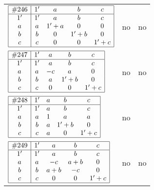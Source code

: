 \documentclass[12pt]{article}
\theoremstyle{definition}
\newcommand{\join}{\mathbin{+}}%
\newcommand{\id}{{1'}}%
\renewcommand{\top}{1}%
\begin{document}
\begin{center}
\begin{longtable}{l|c|c}
$
\begin{array}{|c|cccc|} \hline
\#246 & \id & a & b & c \\ \hline
\id & \id & a & b & c \\
a & a & \id \join a & 0 & 0 \\
b & b & 0 & \id \join b & 0 \\
c & c & 0 & 0 & \id \join c \\ \hline
\end{array}
$
 & no  
 & no      \\[15mm]

$
\begin{array}{|c|cccc|} \hline
\#247 & \id & a & b & c \\ \hline
\id & \id & a & b & c \\
a & a & -c & a & 0 \\
b & b & a & \id \join b & 0 \\
c & c & 0 & 0 & \id \join c \\ \hline
\end{array}
$
 & no  
 & no      \\[15mm]

$
\begin{array}{|c|cccc|} \hline
\#248 & \id & a & b & c \\ \hline
\id & \id & a & b & c \\
a & a & \top & a & a \\
b & b & a & \id \join b & 0 \\
c & c & a & 0 & \id \join c \\ \hline
\end{array}
$
 & no  
 & \adjustbox{valign=c, max height=1.6cm}{$
\left[ \begin{array}{ccccccc}
\id & a & a & b & a & b & a \\ 
a & \id & a & a & c & a & c \\ 
a & a & \id & a & a & a & a \\ 
b & a & a & \id & a & b & a \\ 
a & c & a & a & \id & a & c \\ 
b & a & a & b & a & \id & a \\ 
a & c & a & a & c & a & \id
\end{array}\right]
$}      \\[15mm]

$
\begin{array}{|c|cccc|} \hline
\#249 & \id & a & b & c \\ \hline
\id & \id & a & b & c \\
a & a & -c & a \join b & 0 \\
b & b & a \join b & -c & 0 \\
c & c & 0 & 0 & \id \join c \\ \hline
\end{array}
$
 & no  
 & no      \\[15mm]


\end{longtable}
\end{center}
\end{document}
